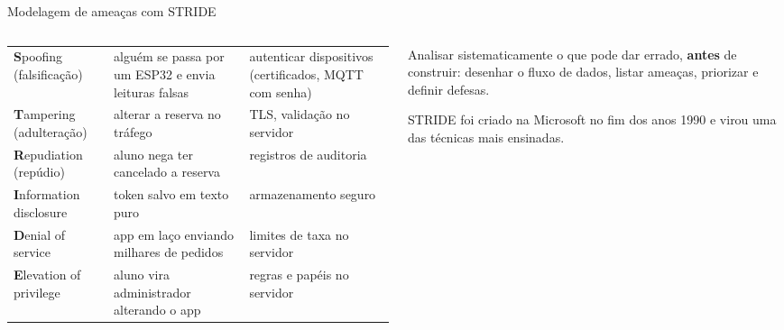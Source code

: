 \begin{frame}{Modelagem de ameaças com STRIDE}
  \begin{columns}[T]
    \begin{column}{0.62\textwidth}
      \scriptsize
      \begin{tabularx}{\linewidth}{@{}l L L@{}}
        \toprule
         &  &  \\
        \midrule
        \textbf{S}poofing (falsificação) & alguém se passa por um ESP32 e envia leituras falsas & autenticar dispositivos (certificados, MQTT com senha) \\
        \textbf{T}ampering (adulteração) & alterar a reserva no tráfego & TLS, validação no servidor \\
        \textbf{R}epudiation (repúdio) & aluno nega ter cancelado a reserva & registros de auditoria \\
        \textbf{I}nformation disclosure & token salvo em texto puro & armazenamento seguro \\
        \textbf{D}enial of service & app em laço enviando milhares de pedidos & limites de taxa no servidor \\
        \textbf{E}levation of privilege & aluno vira administrador alterando o app & regras e papéis no servidor \\
        \bottomrule
      \end{tabularx}
    \end{column}
    \begin{column}{0.36\textwidth}
      \begin{definicao}
        Analisar sistematicamente o que pode dar errado, \textbf{antes} de construir: desenhar o fluxo de dados, listar ameaças, priorizar e definir defesas.
      \end{definicao}
      \begin{historia}
        STRIDE foi criado na Microsoft no fim dos anos 1990 e virou uma das técnicas mais ensinadas.
      \end{historia}
    \end{column}
  \end{columns}
\end{frame}

